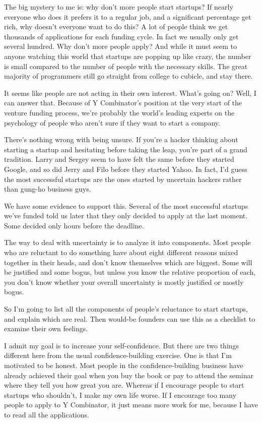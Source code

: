 The big mystery to me is: why don't more people start startups? If
nearly everyone who does it prefers it to a regular job, and a
significant percentage get rich, why doesn't everyone want to do this? A
lot of people think we get thousands of applications for each funding
cycle. In fact we usually only get several hundred. Why don't more
people apply? And while it must seem to anyone watching this world that
startups are popping up like crazy, the number is small compared to the
number of people with the necessary skills. The great majority of
programmers still go straight from college to cubicle, and stay there.

It seems like people are not acting in their own interest. What's going
on? Well, I can answer that. Because of Y Combinator's position at the
very start of the venture funding process, we're probably the world's
leading experts on the psychology of people who aren't sure if they want
to start a company.

There's nothing wrong with being unsure. If you're a hacker thinking
about starting a startup and hesitating before taking the leap, you're
part of a grand tradition. Larry and Sergey seem to have felt the same
before they started Google, and so did Jerry and Filo before they
started Yahoo. In fact, I'd guess the most successful startups are the
ones started by uncertain hackers rather than gung-ho business guys.

We have some evidence to support this. Several of the most successful
startups we've funded told us later that they only decided to apply at
the last moment. Some decided only hours before the deadline.

The way to deal with uncertainty is to analyze it into components. Most
people who are reluctant to do something have about eight different
reasons mixed together in their heads, and don't know themselves which
are biggest. Some will be justified and some bogus, but unless you know
the relative proportion of each, you don't know whether your overall
uncertainty is mostly justified or mostly bogus.

So I'm going to list all the components of people's reluctance to start
startups, and explain which are real. Then would-be founders can use
this as a checklist to examine their own feelings.

I admit my goal is to increase your self-confidence. But there are two
things different here from the usual confidence-building exercise. One
is that I'm motivated to be honest. Most people in the
confidence-building business have already achieved their goal when you
buy the book or pay to attend the seminar where they tell you how great
you are. Whereas if I encourage people to start startups who shouldn't,
I make my own life worse. If I encourage too many people to apply to Y
Combinator, it just means more work for me, because I have to read all
the applications.

